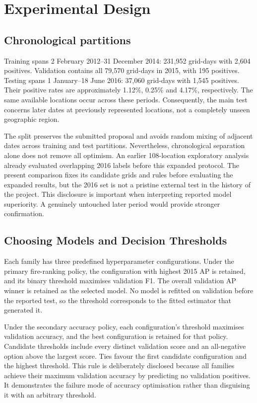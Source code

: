 \documentclass[conference,a4paper]{IEEEtran}
\begin{document}
\section{Experimental Design}
\subsection{Chronological partitions}
Training spans 2 February 2012--31 December 2014: 231,952 grid-days with 2,604 positives. Validation contains all 79,570 grid-days in 2015, with 195 positives. Testing spans 1 January--18 June 2016: 37,060 grid-days with 1,545 positives. Their positive rates are approximately 1.12\%, 0.25\% and 4.17\%, respectively. The same available locations occur across these periods. Consequently, the main test concerns later dates at previously represented locations, not a completely unseen geographic region.

The split preserves the submitted proposal and avoids random mixing of adjacent dates across training and test partitions. Nevertheless, chronological separation alone does not remove all optimism. An earlier 108-location exploratory analysis already evaluated overlapping 2016 labels before this expanded protocol. The present comparison fixes its candidate grids and rules before evaluating the expanded results, but the 2016 set is not a pristine external test in the history of the project. This disclosure is important when interpreting reported model superiority. A genuinely untouched later period would provide stronger confirmation.

\subsection{Choosing Models and Decision Thresholds}
Each family has three predefined hyperparameter configurations. Under the primary fire-ranking policy, the configuration with highest 2015 AP is retained, and its binary threshold maximises validation F1. The overall validation AP winner is retained as the selected model. No model is refitted on validation before the reported test, so the threshold corresponds to the fitted estimator that generated it.

Under the secondary accuracy policy, each configuration's threshold maximises validation accuracy, and the best configuration is retained for that policy. Candidate thresholds include every distinct validation score and an all-negative option above the largest score. Ties favour the first candidate configuration and the highest threshold. This rule is deliberately disclosed because all families achieve their maximum validation accuracy by predicting no validation positives. It demonstrates the failure mode of accuracy optimisation rather than disguising it with an arbitrary threshold.
\end{document}
